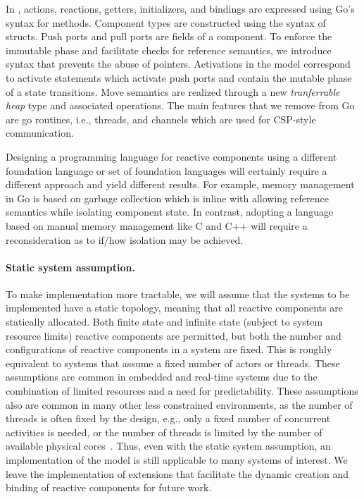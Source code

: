 In \rcgo{}, actions, reactions, getters, initializers, and bindings are expressed using Go's syntax for methods.
Component types are constructed using the syntax of structs.
Push ports and pull ports are fields of a component.
To enforce the immutable phase and facilitate checks for reference semantics, we introduce syntax that prevents the abuse of pointers.
Activations in the model correspond to activate statements which activate push ports and contain the mutable phase of a state transitions.
Move semantics are realized through a new \emph{tranferrable heap} type and associated operations.
The main features that we remove from Go are go routines, i.e., threads, and channels which are used for CSP-style communication.

Designing a programming language for reactive components using a different foundation language or set of foundation languages will certainly require a different approach and yield different results.
For example, memory management in Go is based on garbage collection which is inline with allowing reference semantics while isolating component state.
In contrast, adopting a language based on manual memory management like C and C++ will require a reconsideration as to if/how isolation may be achieved.

\paragraph{Static system assumption.}
To make implementation more tractable, we will assume that the systems to be implemented have a static topology, meaning that all reactive components are statically allocated.
Both finite state and infinite state (subject to system resource limits) reactive components are permitted, but both the number and configurations of reactive components in a system are fixed.
This is roughly equivalent to systems that assume a fixed number of actors or threads.
These assumptions are common in embedded and real-time systems due to the combination of limited resources and a need for predictability.
These assumptions also are common in many other less constrained environments, as the number of threads is often fixed by the design, e.g., only a fixed number of concurrent activities is needed, or the number of threads is limited by the number of available physical cores~\cite{williams2012c++}.
Thus, even with the static system assumption, an implementation of the model is still applicable to many systems of interest.
We leave the implementation of extensions that facilitate the dynamic creation and binding of reactive components for future work.

